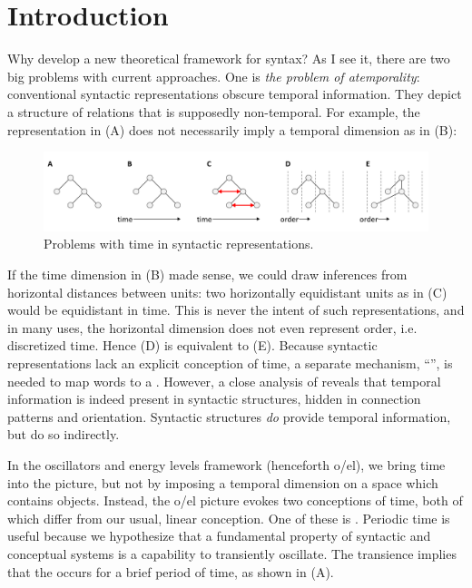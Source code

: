 \chapter{Introduction}

Why develop a new theoretical framework for syntax? As I see it, there are two big problems with current approaches. One is \textit{the problem of atemporality}: conventional syntactic representations obscure temporal information. They depict a structure of relations that is supposedly non-temporal. For example, the representation in {}(A) does not necessarily imply a temporal dimension as in (B): 

  
\begin{figure}
\includegraphics[width=\textwidth]{figures/Tilsen-img1.png}
\caption{Problems with time in syntactic representations.}
\label{fig:1:1}
\end{figure}
 

  If the time dimension in (B) made sense, we could draw inferences from horizontal distances between units: two horizontally equidistant units as in (C) would be equidistant in time. This is never the intent of such representations, and in many uses, the horizontal dimension does not even represent order, i.e. discretized time. Hence (D) is equivalent to (E). Because syntactic representations lack an explicit conception of time, a separate mechanism, “”, is needed to map words to a .  However, a close analysis of  reveals that temporal information is indeed present in syntactic structures, hidden in connection patterns and orientation. Syntactic structures \textit{do} provide temporal information, but do so indirectly.

  In the oscillators and energy levels framework (henceforth o/el), we bring time into the picture, but not by imposing a temporal dimension on a space which contains objects. Instead, the o/el picture evokes two conceptions of time, both of which differ from our usual, linear conception. One of these is . Periodic time is useful because we hypothesize that a fundamental property of syntactic and conceptual systems is a capability to transiently oscillate. The transience implies that the  occurs for a brief period of time, as shown in {}(A). 

